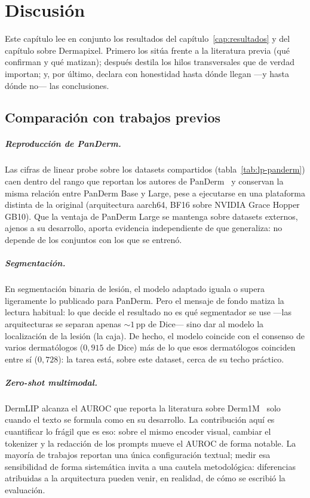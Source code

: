
\chapter{Discusión}
\label{cap:discusion}

Este capítulo lee en conjunto los resultados del
capítulo~\ref{cap:resultados} y del capítulo sobre Dermapixel. Primero
los sitúa frente a la literatura previa (qué confirman y qué matizan);
después destila los hilos transversales que de verdad importan; y, por
último, declara con honestidad hasta dónde llegan ---y hasta dónde no---
las conclusiones.

\section{Comparación con trabajos previos}

\paragraph{Reproducción de PanDerm.} Las cifras de linear probe sobre
los datasets compartidos (tabla~\ref{tab:lp-panderm}) caen dentro del
rango que reportan los autores de PanDerm~\cite{panderm2025} y conservan
la misma relación entre PanDerm Base y Large, pese a ejecutarse en una
plataforma distinta de la original (arquitectura aarch64, BF16 sobre
NVIDIA Grace Hopper GB10). Que la ventaja de PanDerm Large se mantenga
sobre datasets externos, ajenos a su desarrollo, aporta evidencia
independiente de que generaliza: no depende de los conjuntos con los que
se entrenó.

\paragraph{Segmentación.} En segmentación binaria de lesión, el modelo
adaptado iguala o supera ligeramente lo publicado para PanDerm. Pero el
mensaje de fondo matiza la lectura habitual: lo que decide el resultado
no es qué segmentador se use ---las arquitecturas se separan apenas
$\sim 1$\,pp de Dice--- sino dar al modelo la localización de la lesión
(la caja). De hecho, el modelo coincide con el consenso de varios
dermatólogos ($0{,}915$ de Dice) más de lo que esos dermatólogos
coinciden entre sí ($0{,}728$): la tarea está, sobre este dataset, cerca
de su techo práctico.

\paragraph{Zero-shot multimodal.} DermLIP alcanza el AUROC que reporta
la literatura sobre Derm1M~\cite{derm1m} solo cuando el texto se formula
como en su desarrollo. La contribución aquí es cuantificar lo frágil que
es eso: sobre el mismo encoder visual, cambiar el tokenizer y la
redacción de los prompts mueve el AUROC de forma notable. La mayoría de
trabajos reportan una única configuración textual; medir esa
sensibilidad de forma sistemática invita a una cautela metodológica:
diferencias atribuidas a la arquitectura pueden venir, en realidad, de
cómo se escribió la evaluación.

